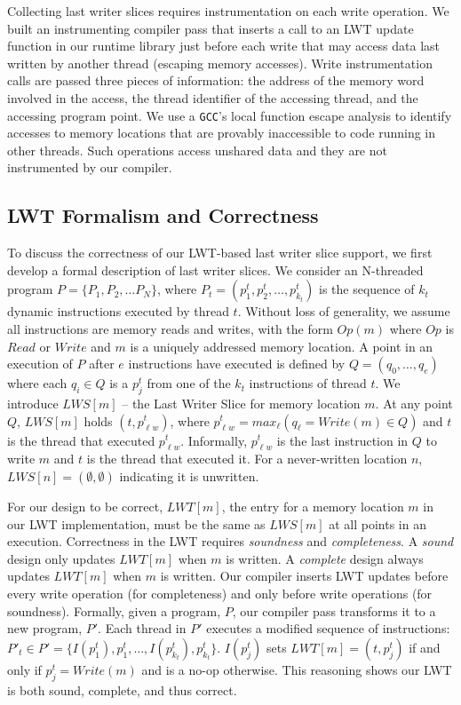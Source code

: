 \documentclass[preprint,9pt]{sigplanconf}
\newcommand{\lwt}{LWT\xspace}
\begin{document}
Collecting last writer slices requires instrumentation on each write operation.
We built an instrumenting compiler pass that inserts a call to an \lwt update
function in our runtime library just before each write that may access data
last written by another thread (escaping memory accesses).  Write
instrumentation calls are passed three pieces of information: the address of
the memory word involved in the access, the thread identifier of the accessing
thread, and the accessing program point.   We use a {\tt GCC}'s local function
escape analysis to identify accesses to memory locations that are provably
inaccessible to code running in other threads.  Such operations access unshared
data and they are not instrumented by our compiler.  



\subsection{\lwt Formalism and Correctness}
\label{sec:lwssoundness}
To discuss the correctness of our \lwt-based last writer slice support, we
first develop a formal description of last writer slices.  We consider an
N-threaded program $P = \{P_1, P_2, \ldots P_N\}$, where $P_t = (p^{t}_{1},
p^{t}_{2}, \ldots, p^{t}_{k_{t}})$ is the sequence of $k_{t}$ dynamic
instructions executed by thread $t$.  Without loss of generality, we assume all
instructions are memory reads and writes, with the form $Op(m)$ where $Op$ is
$Read$ or $Write$ and $m$ is a uniquely addressed memory location.
A point in an execution of $P$ after $e$ instructions have
executed is defined by $Q = (q_{0}, \ldots, q_{e})$ where each $q_{i} \in Q$ is a
$p^{t}_{j}$ from one of the $k_t$ instructions of thread $t$.  We introduce
$LWS[m]$ -- the Last Writer Slice for memory location $m$.   At any point $Q$,
$LWS[m]$ holds $(t,p^{t}_{\ell w})$, where $p^{t}_{\ell w} = max_{\ell}( 
q_{\ell} = Write(m) \in Q)$ and $t$ is the thread that
executed $p^{t}_{\ell w}$. Informally, $p^{t}_{\ell w}$ is the last instruction
in $Q$ to write $m$ and $t$ is the thread that executed it.  For a
never-written location $n$, $LWS[n] = (\emptyset,\emptyset)$ indicating it is
unwritten.

For our design to be correct, $LWT[m]$, the entry for a memory location $m$ in
our \lwt implementation, must be the same as $LWS[m]$ at all points in an
execution.  Correctness in the \lwt requires {\em soundness} and {\em
completeness}.  A {\em sound} design only updates $LWT[m]$ when $m$ is written.
A {\em complete} design always updates $LWT[m]$ when $m$ is written.  Our
compiler inserts \lwt updates before every write operation (for completeness)
and only before write operations (for soundness).  Formally, given a program,
$P$, our compiler pass transforms it to a new program, $P'$.  Each thread in
$P'$ executes a modified sequence of instructions: $P'_{t} \in P' = \{
I(p^{t}_{1}), p^{t}_{1}, \ldots, I(p^{t}_{k_{t}}), p^{t}_{k_{t}} \}$.
$I(p^{t}_{j})$ sets $LWT[m] = (t,p^{t}_{j})$ if and only if $p^{t}_{j} =
Write(m)$ and is a no-op otherwise.  This reasoning shows our \lwt is both
sound, complete, and thus correct.
\end{document}
